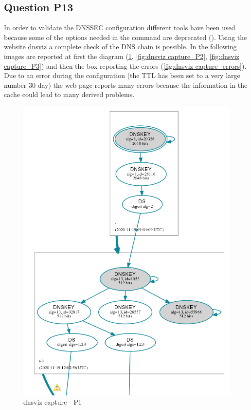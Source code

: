 \subsection{Question P13}
In order to validate the DNSSEC configuration different tools have been used because some of the options needed in the  command are deprecated (). Using the website \href{www.dnsviz.net}{dnsviz} a complete check of the DNS chain is possible. In the following images are reported at first the diagram (\ref{fig:dnsviz capture_P1}, \ref{fig:dnsviz capture_P2}, \ref{fig:dnsviz capture_P3}) and then the box reporting the errors (\ref{fig:dnsviz capture_errors}). Due to an error during the configuration (the TTL has been set to a very large number 30 day) the web page reports many errors because the information in the cache could lead to many derived problems.
\begin{figure}[H]
	\centering
	\includegraphics[width=0.7\linewidth]{images/dnspath1.png}
	\caption{dnsviz capture - P1}
	\label{fig:dnsviz capture_P1}
\end{figure}
